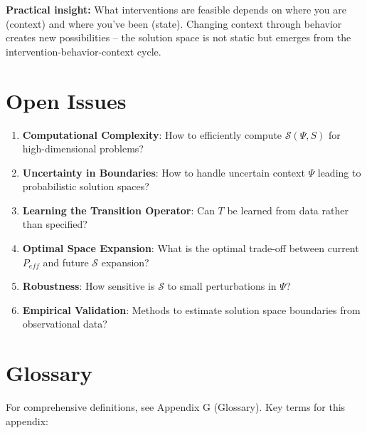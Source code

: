 \textbf{Practical insight:} What interventions are feasible depends on where you are (context) and where you've been (state). Changing context through behavior creates new possibilities -- the solution space is not static but emerges from the intervention-behavior-context cycle.

\section{Open Issues}
\label{sec:ss-open}

\begin{enumerate}
    \item \textbf{Computational Complexity}: How to efficiently compute $\mathcal{S}(\Psi, S)$ for high-dimensional problems?

    \item \textbf{Uncertainty in Boundaries}: How to handle uncertain context $\Psi$ leading to probabilistic solution spaces?

    \item \textbf{Learning the Transition Operator}: Can $T$ be learned from data rather than specified?

    \item \textbf{Optimal Space Expansion}: What is the optimal trade-off between current $P_{eff}$ and future $\mathcal{S}$ expansion?

    \item \textbf{Robustness}: How sensitive is $\mathcal{S}$ to small perturbations in $\Psi$?

    \item \textbf{Empirical Validation}: Methods to estimate solution space boundaries from observational data?
\end{enumerate}

\section{Glossary}
\label{sec:ss-glossary}

For comprehensive definitions, see Appendix G (Glossary). Key terms for this appendix:

